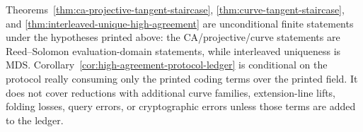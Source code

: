 \begin{remark}
Theorems~\ref{thm:ca-projective-tangent-staircase},
\ref{thm:curve-tangent-staircase}, and
\ref{thm:interleaved-unique-high-agreement} are unconditional finite
statements under the hypotheses printed above: the CA/projective/curve
statements are Reed--Solomon evaluation-domain statements, while interleaved
uniqueness is MDS.  Corollary~\ref{cor:high-agreement-protocol-ledger} is
conditional on the protocol really consuming only the printed coding terms over
the printed field.  It does not cover reductions with additional curve
families, extension-line lifts, folding losses, query errors, or cryptographic
errors unless those terms are added to the ledger.
\end{remark}
